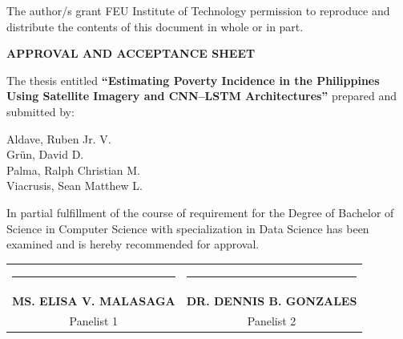 \documentclass[12pt, letterpaper]{article}
\numberwithin{figure}{section}
\numberwithin{table}{section}
\begin{document}
\begin{center}
  The author/s grant FEU Institute of Technology permission to
  reproduce and distribute the contents of this document in whole or in part.
\end{center}

\newpage
{}
\begin{center}

  \textbf{APPROVAL AND ACCEPTANCE SHEET}

  \vspace{1cm}

  \begin{minipage}{1\textwidth}
    \justifying
    The thesis entitled \textbf{“Estimating Poverty Incidence in the
      Philippines Using
    Satellite Imagery and CNN–LSTM Architectures”} prepared and submitted by:
  \end{minipage}

  \vspace{0.5cm}
  {Aldave, Ruben Jr. V. \\
    Gr\"{u}n, David D. \\
    Palma, Ralph Christian M. \\
  Viacrusis, Sean Matthew L.}

  \vspace{0.5cm}
  \begin{minipage}{1\textwidth}
    \justifying
    In partial fulfillment of the course of requirement for the
    Degree of Bachelor of Science in Computer Science with
    specialization in Data Science has been examined and is hereby
    recommended for approval.
  \end{minipage}

  \vspace{1cm}

  \begin{tabular}{cc}
    \rule{6cm}{0.4pt} & \hspace{1cm} \rule{6cm}{0.4pt} \\
    \textbf{MS. ELISA V. MALASAGA} & \hspace{1cm} \textbf{DR. DENNIS
    B. GONZALES} \\
    Panelist 1 & \hspace{1cm} Panelist 2 \\
  \end{tabular}


\end{center}
\end{document}

